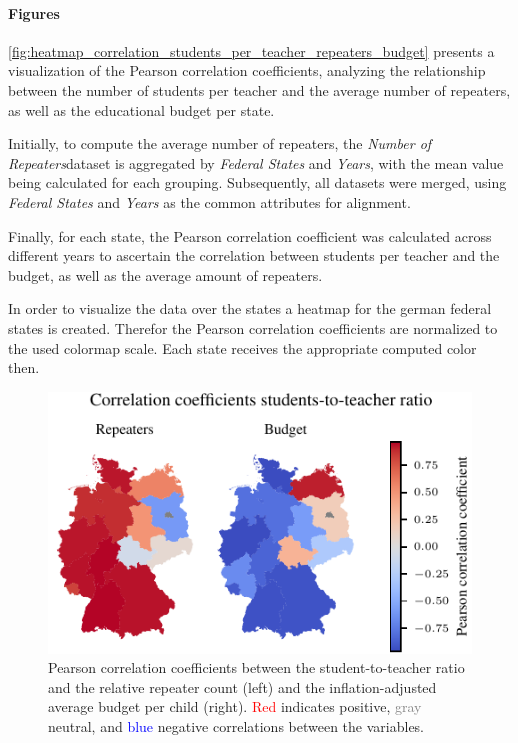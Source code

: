 \paragraph{Figures}
\autoref{fig:heatmap_correlation_students_per_teacher_repeaters_budget} presents a visualization of the Pearson correlation coefficients, analyzing the relationship between the number of students per teacher and the average number of repeaters, as well as the educational budget per state. 

Initially, to compute the average number of repeaters, the \textit{Number of Repeaters}dataset is aggregated by \textit{Federal States} and \textit{Years}, with the mean value being calculated for each grouping. Subsequently, all datasets were merged, using \textit{Federal States} and \textit{Years} as the common attributes for alignment. 

Finally, for each state, the Pearson correlation coefficient was calculated across different years to ascertain the correlation between students per teacher and the budget, as well as the average amount of repeaters.

In order to visualize the data over the states a heatmap for the german federal states is created. Therefor the Pearson correlation coefficients are normalized to the used colormap scale. Each state receives the appropriate computed color then.

\begin{figure}[h]
    \centering
    \includegraphics{fig/fig_heatmap_correlation_students_per_teacher_repeaters_budget.pdf}
    \caption{Pearson correlation coefficients between the student-to-teacher ratio and the relative repeater count (left) and the inflation-adjusted average budget per child (right). \textcolor{red}{Red} indicates positive, \textcolor{gray}{gray} neutral, and \textcolor{blue}{blue} negative correlations between the variables.}
    \label{fig:heatmap_correlation_students_per_teacher_repeaters_budget}
\end{figure}

